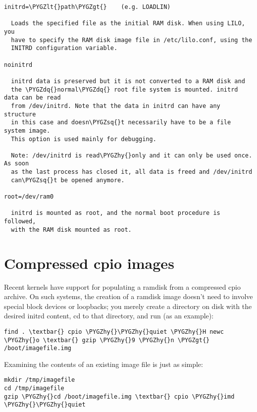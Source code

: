 \documentclass[a4paper,8pt,english]{sphinxmanual}
\def\PYGZlt{\char`\<}
\def\PYGZgt{\char`\>}
\def\PYGZhy{\char`\-}
\def\PYGZsq{\char`\'}
\def\PYGZdq{\char`\"}
\renewcommand\PYGZsq{\textquotesingle}
\begin{document}
\begin{Verbatim}[commandchars=\\\{\}]
initrd=\PYGZlt{}path\PYGZgt{}    (e.g. LOADLIN)

  Loads the specified file as the initial RAM disk. When using LILO, you
  have to specify the RAM disk image file in /etc/lilo.conf, using the
  INITRD configuration variable.

noinitrd

  initrd data is preserved but it is not converted to a RAM disk and
  the \PYGZdq{}normal\PYGZdq{} root file system is mounted. initrd data can be read
  from /dev/initrd. Note that the data in initrd can have any structure
  in this case and doesn\PYGZsq{}t necessarily have to be a file system image.
  This option is used mainly for debugging.

  Note: /dev/initrd is read\PYGZhy{}only and it can only be used once. As soon
  as the last process has closed it, all data is freed and /dev/initrd
  can\PYGZsq{}t be opened anymore.

root=/dev/ram0

  initrd is mounted as root, and the normal boot procedure is followed,
  with the RAM disk mounted as root.
\end{Verbatim}


\section{Compressed cpio images}
\label{admin-guide/initrd:compressed-cpio-images}
Recent kernels have support for populating a ramdisk from a compressed cpio
archive. On such systems, the creation of a ramdisk image doesn't need to
involve special block devices or loopbacks; you merely create a directory on
disk with the desired initrd content, cd to that directory, and run (as an
example):

\begin{Verbatim}[commandchars=\\\{\}]
find . \textbar{} cpio \PYGZhy{}\PYGZhy{}quiet \PYGZhy{}H newc \PYGZhy{}o \textbar{} gzip \PYGZhy{}9 \PYGZhy{}n \PYGZgt{} /boot/imagefile.img
\end{Verbatim}

Examining the contents of an existing image file is just as simple:

\begin{Verbatim}[commandchars=\\\{\}]
mkdir /tmp/imagefile
cd /tmp/imagefile
gzip \PYGZhy{}cd /boot/imagefile.img \textbar{} cpio \PYGZhy{}imd \PYGZhy{}\PYGZhy{}quiet
\end{Verbatim}
\end{document}
